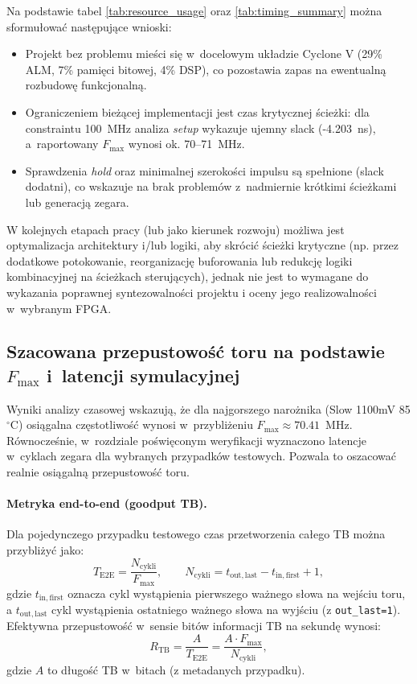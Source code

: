 Na podstawie tabel \ref{tab:resource_usage} oraz \ref{tab:timing_summary} można sformułować następujące wnioski:
\begin{itemize}
    \item Projekt bez problemu mieści się w~docelowym układzie Cyclone V (29\% ALM, 7\% pamięci bitowej, 4\% DSP),
          co pozostawia zapas na ewentualną rozbudowę funkcjonalną.
    \item Ograniczeniem bieżącej implementacji jest czas krytycznej ścieżki: dla constraintu 100~MHz
          analiza \textit{setup} wykazuje ujemny slack (-4.203~ns), a~raportowany $F_{\max}$ wynosi ok. 70--71~MHz.
    \item Sprawdzenia \textit{hold} oraz minimalnej szerokości impulsu są spełnione (slack dodatni),
          co wskazuje na brak problemów z~nadmiernie krótkimi ścieżkami lub generacją zegara.
\end{itemize}

W kolejnych etapach pracy (lub jako kierunek rozwoju) możliwa jest optymalizacja architektury i/lub logiki,
aby skrócić ścieżki krytyczne (np. przez dodatkowe potokowanie, reorganizację buforowania lub redukcję logiki kombinacyjnej
na ścieżkach sterujących), jednak nie jest to wymagane do wykazania poprawnej syntezowalności projektu
i oceny jego realizowalności w~wybranym FPGA.

\subsection{Szacowana przepustowość toru na podstawie $F_{\max}$ i~latencji symulacyjnej}
\label{subsec:throughput_estimation}

Wyniki analizy czasowej wskazują, że dla najgorszego narożnika (Slow 1100mV 85$^\circ$C) osiągalna częstotliwość
wynosi w~przybliżeniu $F_{\max}\approx 70.41$~MHz.
Równocześnie, w~rozdziale poświęconym weryfikacji wyznaczono latencje w~cyklach zegara dla wybranych przypadków testowych.
Pozwala to oszacować realnie osiągalną przepustowość toru.

\paragraph{Metryka end-to-end (goodput TB).}
Dla pojedynczego przypadku testowego czas przetworzenia całego TB można przybliżyć jako:
\[
T_{\mathrm{E2E}} = \frac{N_{\mathrm{cykli}}}{F_{\max}},
\qquad
N_{\mathrm{cykli}} = t_{\mathrm{out,last}} - t_{\mathrm{in,first}} + 1,
\]
gdzie $t_{\mathrm{in,first}}$ oznacza cykl wystąpienia pierwszego ważnego słowa na wejściu toru,
a $t_{\mathrm{out,last}}$ cykl wystąpienia ostatniego ważnego słowa na wyjściu (z \texttt{out\_last=1}).
Efektywna przepustowość w~sensie bitów informacji TB na sekundę wynosi:
\[
R_{\mathrm{TB}} = \frac{A}{T_{\mathrm{E2E}}} = \frac{A\cdot F_{\max}}{N_{\mathrm{cykli}}},
\]
gdzie $A$ to długość TB w~bitach (z metadanych przypadku).

